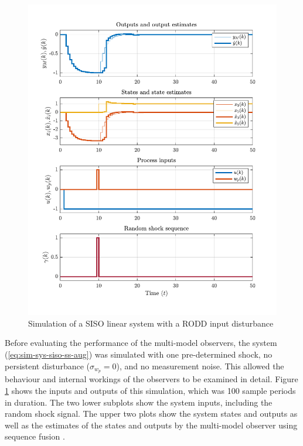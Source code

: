 \begin{figure}[htp]
	\centering
	\includegraphics[width=13cm]{images/rod_MKF_SF_test_sim_MKF_SF95_ioplot.pdf}
	\caption{Simulation of a SISO linear system with a RODD input disturbance}
	\label{fig:rod-obs-sim-test-ioplot-SF95}
\end{figure}
Before evaluating the performance of the multi-model observers, the system (\ref{eq:sim-sys-siso-ss-aug}) was simulated with one pre-determined shock, no persistent disturbance ($\sigma_{w_p}=0$), and no measurement noise. This allowed the behaviour and internal workings of the observers to be examined in detail. Figure \ref{fig:rod-obs-sim-test-ioplot-SF95} shows the inputs and outputs of this simulation, which was 100 sample periods in duration. The two lower subplots show the system inputs, including the random shock signal. The upper two plots show the system states and outputs as well as the estimates of the states and outputs by the multi-model observer using sequence fusion \citep{robertson_detection_1995}.

